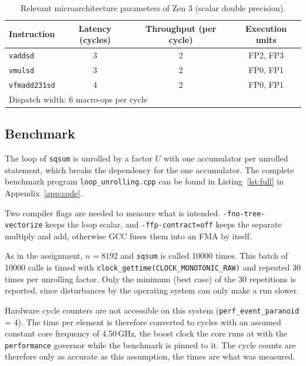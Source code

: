 \documentclass[a4paper,11pt]{article}
\begin{document}
\begin{table}[ht]
    \centering
    \caption{Relevant microarchitecture parameters of Zen 3 (scalar double precision).}
    \label{tab:uarch}
    \begin{tabular}{lccc}
        \hline
        Instruction & Latency (cycles) & Throughput (per cycle) & Execution units \\
        \hline
        \texttt{vaddsd} & 3 & 2 & FP2, FP3 \\
        \texttt{vmulsd} & 3 & 2 & FP0, FP1 \\
        \texttt{vfmadd231sd} & 4 & 2 & FP0, FP1 \\
        \hline
        \multicolumn{4}{l}{Dispatch width: 6 macro-ops per cycle} \\
        \hline
    \end{tabular}
\end{table}

\subsection{Benchmark}

The loop of \texttt{sqsum} is unrolled by a factor $U$ with one accumulator per unrolled statement, which breaks the dependency for the one accumulator.
The complete benchmark program \texttt{loop\_unrolling.cpp} can be found in Listing~\ref{lst:full} in Appendix~\ref{app:code}.

Two compiler flags are needed to measure what is intended.
\texttt{-fno-tree-vectorize} keeps the loop scalar, and \texttt{-ffp-contract=off} keeps the separate multiply and add, otherwise GCC fuses them into an FMA by itself.

As in the assignment, $n = 8192$ and \texttt{sqsum} is called 10000 times.
This batch of 10000 calls is timed with
\texttt{clock\_gettime(CLOCK\_MONOTONIC\_RAW)} and repeated 30 times per
unrolling factor. Only the minimum (best case) of the 30 repetitions is reported, since
disturbances by the operating system can only make a run slower.

Hardware cycle counters are not accessible on this system
(\texttt{perf\_event\_paranoid} = 4). The time per element is therefore
converted to cycles with an assumed constant core frequency of 4.50\,GHz,
the boost clock the core runs at with the \texttt{performance} governor
while the benchmark is pinned to it. The cycle counts are therefore only as
accurate as this assumption, the times are what was measured.
\end{document}
